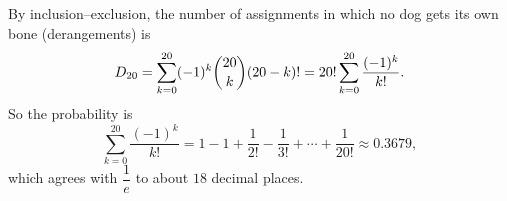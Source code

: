 By inclusion--exclusion, the number of assignments in which no dog gets its own bone (derangements) is
\[D_{20}=\sum_{k=0}^{20}(-1)^k\dbinom{20}{k}(20-k)!=20!\sum_{k=0}^{20}\dfrac{(-1)^k}{k!}.\]
So the probability is
\[\boxed{\sum_{k=0}^{20}\dfrac{(-1)^k}{k!}}=1-1+\dfrac{1}{2!}-\dfrac{1}{3!}+\cdots+\dfrac{1}{20!}\approx0.3679,\]
which agrees with $\dfrac{1}{e}$ to about $18$ decimal places.
